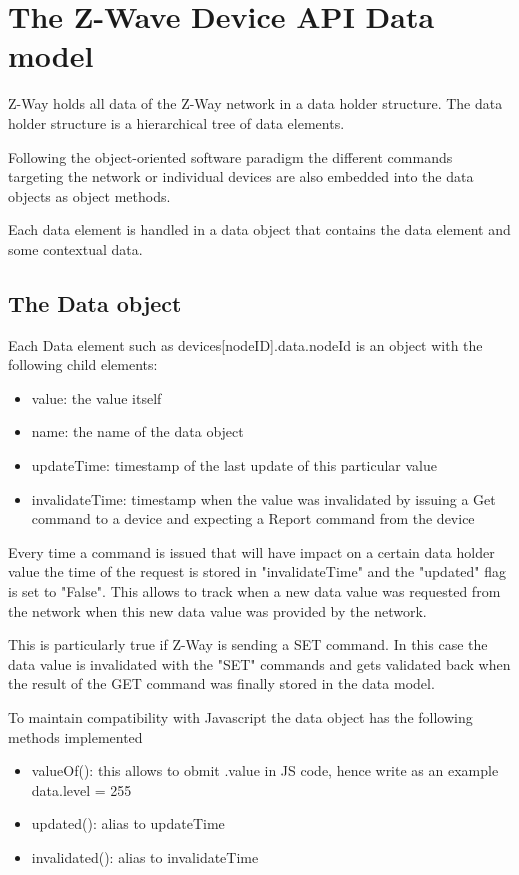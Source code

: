 \section{The Z-Wave Device API Data model}
\label{datamodel} 
 
Z-Way holds all data of the Z-Way network  in a data holder structure. The data holder 
structure is a hierarchical tree of data elements.  

Following the object-oriented software paradigm the different commands targeting the 
network or individual devices are also embedded into the data objects as object methods.
 
Each data element is handled in a data object that contains the data element and some contextual data.

\subsection{The Data object}
 
Each Data element such as devices[nodeID].data.nodeId is an object with the following child elements:
\begin{itemize}
\item value: the value itself
\item name: the name of the data object
\item updateTime: timestamp of the last update of this particular value
\item invalidateTime: timestamp when the value was invalidated by issuing a Get command 
to a device and expecting a Report command from the device
\end{itemize}

Every time a command is issued that will have impact on a certain data holder value the 
time of the request is stored in "invalidateTime" and the "updated" flag is set to "False". 
This allows to track when a new data value was requested from the network when this new 
data value was provided by the network.

This is particularly true if Z-Way is sending a SET command. In this case the data value 
is invalidated with the "SET" commands and gets validated back when the 
result of the GET command was finally stored in the data model.

To maintain compatibility with Javascript the data object has the following methods implemented

\begin{itemize}
\item valueOf(): this allows to obmit .value in JS code, hence write as an example data.level = 255
\item updated(): alias to updateTime
\item invalidated(): alias to invalidateTime
\end{itemize}


